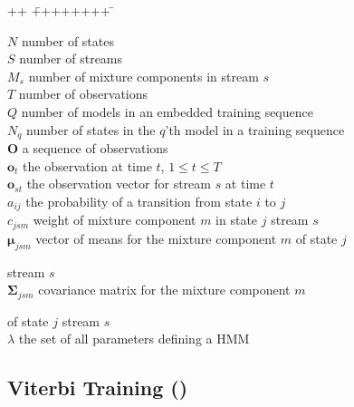 \begin{tabbing}


++ \= ++++++++ \= \kill


\> $N$ \> number of states \\


\> $S$ \> number of streams \\


\> $M_s$ \> number of mixture components in stream $s$\\


\> $T$ \> number of observations \\


\> $Q$ \> number of models in an embedded training sequence \\


\> $N_q$ \> number of states in the $q$'th model in a training sequence \\


\> $\bm{O}$      \> a sequence of observations \\


\> $\bm{o}_t$    \> the observation at time $t$, $1 \leq t \leq T $ \\


\> $\bm{o}_{st}$ \> the observation vector for stream $s$ at time $t$ \\


\> $a_{ij}$       \> the probability of a transition from state $i$ to $j$ \\


\> $c_{jsm}$    \> weight of mixture component $m$ in state $j$ stream $s$\\


\> $\bm{\mu}_{jsm}$  \> vector of means for the mixture component $m$ of state $j$


                        stream $s$\\ 


\> $\bm{\Sigma}_{jsm}$  \> covariance matrix for the mixture component $m$ 


                         of state $j$  stream $s$ \\


\> $\lambda$ \> the set of all parameters defining a HMM


\end{tabbing}





\subsection{Viterbi Training ()}





